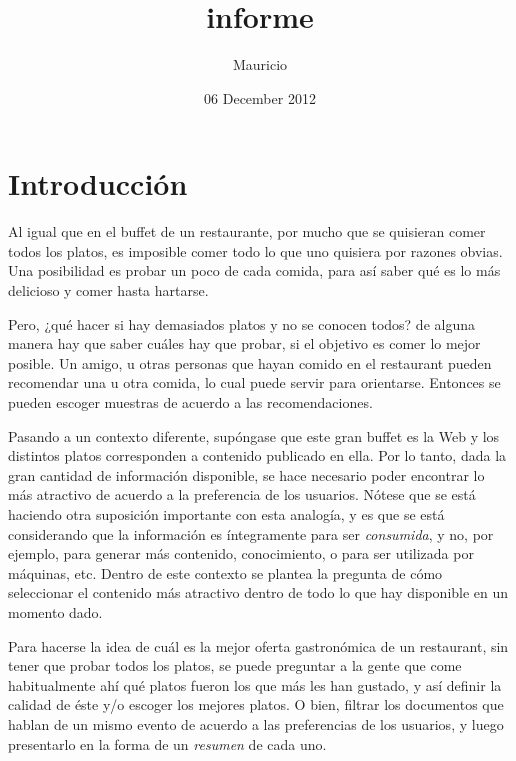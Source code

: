 \documentclass[upright, contnum]{umemoria}
\title{informe}
\author{Mauricio}
\date{06 December 2012}
\begin{document}
\maketitle

\setcounter{tocdepth}{3}
\tableofcontents
\vspace*{1cm}

\chapter{Introducción}
\label{sec-1}


  Al igual que en el buffet de un restaurante, por mucho que se quisieran
  comer todos los platos, es imposible comer todo lo que uno
  quisiera por razones obvias. Una posibilidad es probar un poco de cada
  comida, para así saber qué es lo más delicioso y comer hasta
  hartarse.
  
  Pero, ¿qué hacer si hay demasiados platos y no se conocen todos? de
  alguna manera hay que saber cuáles hay que probar, si el objetivo es
  comer lo mejor posible. Un amigo, u otras personas que hayan comido
  en el restaurant pueden recomendar una u otra comida,
  lo cual puede servir para orientarse. Entonces se pueden escoger
  muestras de acuerdo a las recomendaciones.

  
  Pasando a un contexto diferente, supóngase que este gran buffet es la
  Web y los distintos platos corresponden a contenido publicado en
  ella. Por lo tanto, dada la gran cantidad de información disponible,
  se hace necesario poder encontrar lo más atractivo de acuerdo a la
  preferencia de los usuarios. Nótese que se está
  haciendo otra suposición importante con esta analogía, y es que se
  está considerando que la información es íntegramente para ser
  \emph{consumida}, y no, por ejemplo, para generar más contenido,
  conocimiento, o para ser utilizada por máquinas, etc. Dentro de
  este contexto se plantea la pregunta de cómo seleccionar el contenido
  más atractivo dentro de todo lo que hay disponible en un momento dado.

  Para hacerse la idea de cuál es la mejor oferta gastronómica de un
  restaurant, sin tener que probar todos los platos, se puede
  preguntar a la gente que come habitualmente ahí qué platos fueron
  los que más les han gustado, y así definir la calidad de éste y/o
  escoger los mejores platos. O bien, filtrar los documentos que
  hablan de un mismo evento de acuerdo a las preferencias de los
  usuarios, y luego presentarlo en la forma de un \emph{resumen} de cada
  uno.
\end{document}
